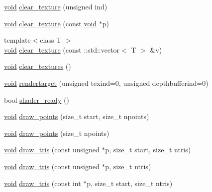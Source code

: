 \begin{DoxyCompactItemize}
\hyperlink{namespacetrimesh_a784ddfd979e1c579bda795a8edfc3f43}{void} \hyperlink{classtrimesh_1_1GLManager_ac5691c703028092195568c2ab75c85aa}{clear\+\_\+texture} (unsigned ind)
\item 
\hyperlink{namespacetrimesh_a784ddfd979e1c579bda795a8edfc3f43}{void} \hyperlink{classtrimesh_1_1GLManager_aa2fefc1b88c7da4f9f31534c77049996}{clear\+\_\+texture} (const \hyperlink{namespacetrimesh_a784ddfd979e1c579bda795a8edfc3f43}{void} $\ast$p)
\item 
{\footnotesize template$<$class T $>$ }\\\hyperlink{namespacetrimesh_a784ddfd979e1c579bda795a8edfc3f43}{void} \hyperlink{classtrimesh_1_1GLManager_aa194ccf4c01b0df5340d34a5516ad581}{clear\+\_\+texture} (const \+::std\+::vector$<$ T $>$ \&v)
\item 
\hyperlink{namespacetrimesh_a784ddfd979e1c579bda795a8edfc3f43}{void} \hyperlink{classtrimesh_1_1GLManager_af7ce5af30b741e3b6ad0dc14fa73d216}{clear\+\_\+textures} ()
\item 
\hyperlink{namespacetrimesh_a784ddfd979e1c579bda795a8edfc3f43}{void} \hyperlink{classtrimesh_1_1GLManager_a98f73dc0002aa8a960b2f54489c0a40a}{rendertarget} (unsigned texind=0, unsigned depthbufferind=0)
\item 
bool \hyperlink{classtrimesh_1_1GLManager_a3be8016421dd828aad517bd23df204ae}{shader\+\_\+ready} ()
\item 
\hyperlink{namespacetrimesh_a784ddfd979e1c579bda795a8edfc3f43}{void} \hyperlink{classtrimesh_1_1GLManager_a15081215953b489d26b793bccbe6f20d}{draw\+\_\+points} (size\+\_\+t start, size\+\_\+t npoints)
\item 
\hyperlink{namespacetrimesh_a784ddfd979e1c579bda795a8edfc3f43}{void} \hyperlink{classtrimesh_1_1GLManager_ab59da541e1fe9a831079f8f924a3a816}{draw\+\_\+points} (size\+\_\+t npoints)
\item 
\hyperlink{namespacetrimesh_a784ddfd979e1c579bda795a8edfc3f43}{void} \hyperlink{classtrimesh_1_1GLManager_af15b259f35b87195abdb772c557ec477}{draw\+\_\+tris} (const unsigned $\ast$p, size\+\_\+t start, size\+\_\+t ntris)
\item 
\hyperlink{namespacetrimesh_a784ddfd979e1c579bda795a8edfc3f43}{void} \hyperlink{classtrimesh_1_1GLManager_ae97a2e8b47a90a6a684ec6306ba906fb}{draw\+\_\+tris} (const unsigned $\ast$p, size\+\_\+t ntris)
\item 
\hyperlink{namespacetrimesh_a784ddfd979e1c579bda795a8edfc3f43}{void} \hyperlink{classtrimesh_1_1GLManager_ae732f7546ceecc47e22ec70fa412023b}{draw\+\_\+tris} (const int $\ast$p, size\+\_\+t start, size\+\_\+t ntris)

\end{DoxyCompactItemize}
